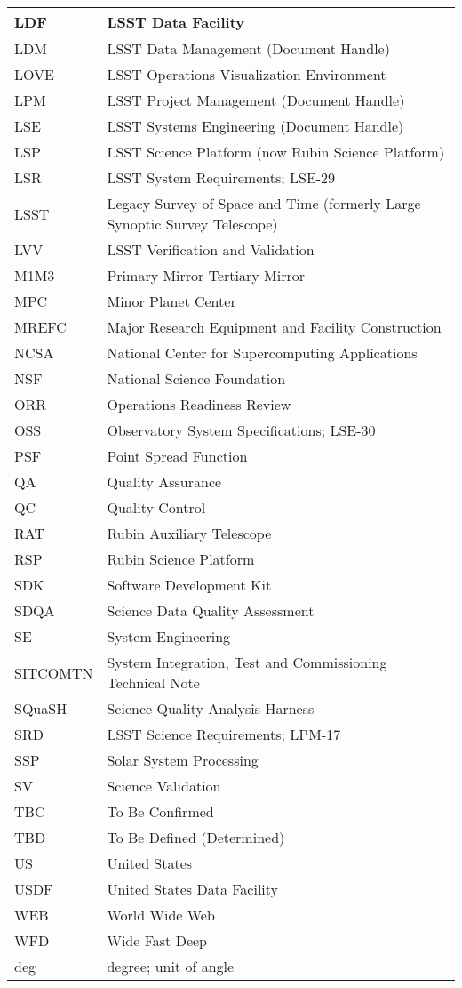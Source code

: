 \begin{longtable}{p{}p{}}
LDF & LSST Data Facility \\\hline
LDM & LSST Data Management (Document Handle) \\\hline
LOVE & LSST Operations Visualization Environment \\\hline
LPM & LSST Project Management (Document Handle) \\\hline
LSE & LSST Systems Engineering (Document Handle) \\\hline
LSP & LSST Science Platform (now Rubin Science Platform) \\\hline
LSR & LSST System Requirements; LSE-29 \\\hline
LSST & Legacy Survey of Space and Time (formerly Large Synoptic Survey Telescope) \\\hline
LVV & LSST Verification and Validation \\\hline
M1M3 & Primary Mirror Tertiary Mirror \\\hline
MPC & Minor Planet Center \\\hline
MREFC & Major Research Equipment and Facility Construction \\\hline
NCSA & National Center for Supercomputing Applications \\\hline
NSF & National Science Foundation \\\hline
ORR & Operations Readiness Review \\\hline
OSS & Observatory System Specifications; LSE-30 \\\hline
PSF & Point Spread Function \\\hline
QA & Quality Assurance \\\hline
QC & Quality Control \\\hline
RAT & Rubin Auxiliary Telescope \\\hline
RSP & Rubin Science Platform \\\hline
SDK & Software Development Kit \\\hline
SDQA & Science Data Quality Assessment \\\hline
SE & System Engineering \\\hline
SITCOMTN & System Integration, Test and Commissioning Technical Note \\\hline
SQuaSH & Science Quality Analysis Harness \\\hline
SRD & LSST Science Requirements; LPM-17 \\\hline
SSP & Solar System Processing \\\hline
SV & Science Validation \\\hline
TBC & To Be Confirmed \\\hline
TBD & To Be Defined (Determined) \\\hline
US & United States \\\hline
USDF & United States Data Facility \\\hline
WEB & World Wide Web \\\hline
WFD & Wide Fast Deep \\\hline
deg & degree; unit of angle \\\hline
\end{longtable}
